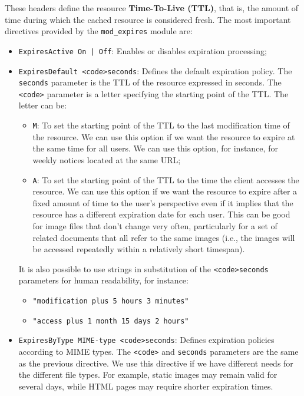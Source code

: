 \documentclass{scrbook}
\begin{document}
	These headers define the resource \textbf{Time-To-Live (TTL)}, that is, the amount of time during which the cached resource is considered fresh. The most important directives provided by the \texttt{mod\_expires} module are:
	\begin{itemize}
		\item
		\texttt{ExpiresActive On | Off}: Enables or disables expiration processing;
		
		\item
		\texttt{ExpiresDefault <code>seconds}: Defines the default expiration policy. The \texttt{seconds} parameter is the TTL of the resource expressed in seconds. The \texttt{<code>} parameter is a letter specifying the starting point of the TTL. The letter can be:
		\begin{itemize}
			\item \texttt{M}: To set the starting point of the TTL to the last modification time of the resource. We can use this option if we want the resource to expire at the same time for all users. We can use this option, for instance, for weekly notices located at the same URL;
			
			\item \texttt{A}: To set the starting point of the TTL to the time the client accesses the resource. We can use this option if we want the resource to expire after a fixed amount of time to the user's perspective even if it implies that the resource has a different expiration date for each user. This can be good for image files that don't change very often, particularly for a set of related documents that all refer to the same images (i.e., the images will be accessed repeatedly within a relatively short timespan).
		\end{itemize}
		
		It is also possible to use strings in substitution of the \texttt{<code>seconds} parameters for human readability, for instance:
		\begin{itemize}
			\item \texttt{"modification plus 5 hours 3 minutes"}
			\item \texttt{"access plus 1 month 15 days 2 hours"}
		\end{itemize}
		
		\item
		\texttt{ExpiresByType MIME-type <code>seconds}: Defines expiration policies according to MIME types. The \texttt{<code>} and \texttt{seconds} parameters are the same as the previous directive. We use this directive if we have different needs for the different file types. For example, static images may remain valid for several days, while HTML pages may require shorter expiration times.		
	\end{itemize}
	
\end{document}
